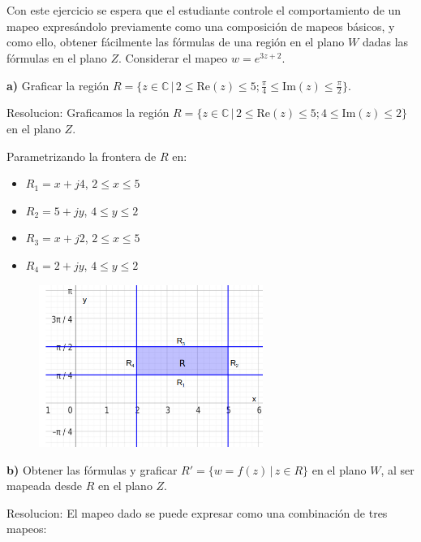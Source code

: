 \documentclass[12pt]{report}
\begin{document}
\chapter{}

Con este ejercicio se espera que el estudiante controle el comportamiento de un mapeo expresándolo previamente como una composición de mapeos básicos, y como ello, obtener fácilmente las fórmulas de una región en el plano $W$ dadas las fórmulas en el plano $Z$. Considerar el mapeo $w = e^{3z + 2}$.

\textbf{a)} Graficar la región $R = \{z \in \mathbb{C} \, | \, 2 \leq \text{Re}(z) \leq 5; \frac{\pi}{4} \leq \text{Im}(z) \leq \frac{\pi}{2}\}$.

Resolucion:
Graficamos la región $R = \{z \in \mathbb{C} \, | \, 2 \leq \text{Re}(z) \leq 5; 4 \leq \text{Im}(z) \leq 2\}$ en el plano $Z$.

Parametrizando la frontera de $R$ en:
\begin{itemize}
    \item $R_1 = x + j4$, $2 \leq x \leq 5$
    \item $R_2 = 5 + jy$, $4 \leq y \leq 2$
    \item $R_3 = x + j2$, $2 \leq x \leq 5$
    \item $R_4 = 2 + jy$, $4 \leq y \leq 2$
\end{itemize}


\begin{figure}[h] %
    \centering %
    \includegraphics[width=0.65\textwidth]{./Imagenes/foto1Ej4.png} %
\end{figure}

\textbf{b)} Obtener las fórmulas y graficar $R' = \{w = f(z) \, | \, z \in R\}$ en el plano $W$, al ser mapeada desde $R$ en el plano $Z$.

Resolucion:
El mapeo dado se puede expresar como una combinación de tres mapeos:
\end{document}
